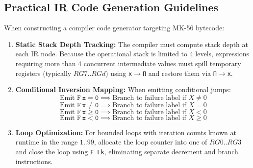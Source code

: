 \documentclass[11pt,a4paper]{article}
\begin{document}
\subsection{Practical IR Code Generation Guidelines}
When constructing a compiler code generator targeting MK-56 bytecode:
\begin{enumerate}
    \item \textbf{Static Stack Depth Tracking:} The compiler must compute stack depth at each IR node. Because the operational stack is limited to 4 levels, expressions requiring more than 4 concurrent intermediate values must spill temporary registers (typically $RG7..RGd$) using \texttt{x$\to$П} and restore them via \texttt{П$\to$x}.
    \item \textbf{Conditional Inversion Mapping:} When emitting conditional jumps:
    \[
    \text{Emit } \mathtt{F\ x=0} \implies \text{Branch to failure label if } X \ne 0
    \]
    \[
    \text{Emit } \mathtt{F\ x\neq0} \implies \text{Branch to failure label if } X = 0
    \]
    \[
    \text{Emit } \mathtt{F\ x\ge0} \implies \text{Branch to failure label if } X < 0
    \]
    \[
    \text{Emit } \mathtt{F\ x<0} \implies \text{Branch to failure label if } X \ge 0
    \]
    \item \textbf{Loop Optimization:} For bounded loops with iteration counts known at runtime in the range $1..99$, allocate the loop counter into one of $RG0..RG3$ and close the loop using \texttt{F Lk}, eliminating separate decrement and branch instructions.
\end{enumerate}
\end{document}
